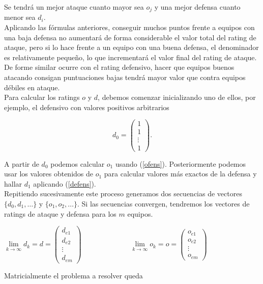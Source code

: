Se tendrá un mejor ataque cuanto mayor sea $o_{j}$ y una mejor defensa cuanto menor sea $d_{i}$.\\
Aplicando las fórmulas anteriores, conseguir muchos puntos frente a equipos con una baja defensa no aumentará de forma considerable el valor total del rating de ataque, pero si lo hace frente a un equipo con una buena defensa, el denominador es relativamente pequeño, lo que incrementará el valor final del rating de ataque. De forme similar ocurre con el rating defensivo, hacer que equipos buenos atacando consigan puntuaciones bajas tendrá mayor valor que contra equipos débiles en ataque.\\

Para calcular los ratings $o$ y $d$, debemos comenzar inicializando uno de ellos, por ejemplo, el defensivo con valores positivos arbitrarios

\[d_{0}=
\left(\begin{array}{c}
1\\
1\\
\vdots \\
1
\end{array} \right).
\]

A partir de $d_{0}$ podemos calcular $o_{1}$ usando (\ref{ofens}). Posteriormente podemos usar los valores obtenidos de $o_{1}$ para calcular valores más exactos de la defensa y hallar $d_{1}$ aplicando (\ref{defens}).\\
Repitiendo sucesivamente este proceso generamos dos secuencias de vectores $\{d_{0},d_{1},\dots\}$ y $\{o_{1},o_{2},\dots\}$. Si las secuencias convergen, tendremos los vectores de ratings de ataque y defensa para los $m$ equipos.
 
\begin{center}
	$
\lim\limits_{k \rightarrow \infty} d_{k} = d = \left(\begin{array}{c}
d_{e1}\\
d_{e2}\\
\vdots \\
d_{em}
\end{array} \right)$      
\ \ \ \ \ \ \ \ \ \ \ \ \
$
\lim\limits_{k \rightarrow \infty} o_{k} = o = \left(\begin{array}{c}
o_{e1}\\
o_{e2}\\
\vdots \\
o_{em}
\end{array} \right)$
\end{center}
 

Matricialmente el problema a resolver queda

